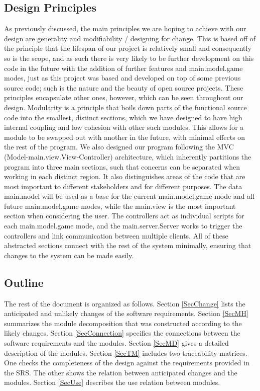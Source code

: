 \documentclass[12pt, titlepage]{article}
\begin{document}
\subsection{Design Principles}

As previously discussed, the main principles we are hoping to achieve with our design are generality and modifiability / designing for change. This is based off of the principle that the lifespan of our project is relatively small and consequently so is the scope, and as such there is very likely to be further development on this code in the future with the addition of further features and main.model.game modes, just as this project was based and developed on top of some previous source code; such is the nature and the beauty of open source projects. These principles encapsulate other ones, however, which can be seen throughout our design. Modularity is a principle that boils down parts of the functional source code into the smallest, distinct sections, which we have designed to have high internal coupling and low cohesion with other such modules. This allows for a module to be swapped out with another in the future, with minimal effects on the rest of the program. We also designed our program following the MVC (Model-main.view.View-Controller) architecture, which inherently partitions the program into three main sections, such that concerns can be separated when working in each distinct region. It also distinguishes areas of the code that are most important to different stakeholders and for different purposes. The data main.model will be used as a base for the current main.model.game mode and all future main.model.game modes, while the main.view is the most important section when considering the user. The controllers act as individual scripts for each main.model.game mode, and the main.server.Server works to trigger the controllers and link communication between multiple clients. All of these abstracted sections connect with the rest of the system minimally, ensuring that changes to the system can be made easily.

\subsection{Outline}

The rest of the document is organized as follows. Section
\ref{SecChange} lists the anticipated and unlikely changes of the software
requirements. Section \ref{SecMH} summarizes the module decomposition that
was constructed according to the likely changes. Section \ref{SecConnection}
specifies the connections between the software requirements and the
modules. Section \ref{SecMD} gives a detailed description of the
modules. Section \ref{SecTM} includes two traceability matrices. One checks
the completeness of the design against the requirements provided in the SRS. The
other shows the relation between anticipated changes and the modules. Section
\ref{SecUse} describes the use relation between modules.
\end{document}
